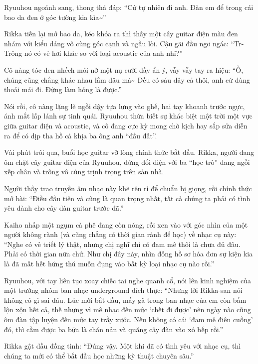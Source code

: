 \documentclass[../main.tex]{subfiles}
\begin{document}
Ryuuhou ngoảnh sang, thong thả đáp: ``Cứ tự nhiên đi anh. Đàn em để trong cái bao da đen ở góc tường kia kìa\~{}''

Rikka tiến lại mở bao da, kéo khóa ra thì thấy một cây guitar điện màu đen nhám với kiểu dáng vô cùng góc cạnh và ngầu lòi. Cậu gãi đầu ngơ ngác: ``Tr-Trông nó có vẻ hơi khác so với loại acoustic của anh nhỉ?''

Cô nàng tóc đen nhếch môi nở một nụ cười đầy ẩn ý, vẫy vẫy tay ra hiệu: ``Ồ, chúng cũng chẳng khác nhau lắm đâu mà\~{} Đều có sáu dây cả thôi, anh cứ dùng thoải mái đi. Đừng làm hỏng là được.''

Nói rồi, cô nàng lặng lẽ ngồi dậy tựa lưng vào ghế, hai tay khoanh trước ngực, ánh mắt lấp lánh sự tinh quái. Ryuuhou thừa biết sự khác biệt một trời một vực giữa guitar điện và acoustic, và cô đang cực kỳ mong chờ kịch hay sắp sửa diễn ra để có dịp tha hồ cà khịa ba ông anh ``đầu đất''.

\ct

Vài phút trôi qua, buổi học guitar vỡ lòng chính thức bắt đầu. Rikka, người đang ôm chặt cây guitar điện của Ryuuhou, đứng đối diện với ba ``học trò'' đang ngồi xếp chân và trông vô cùng trịnh trọng trên sàn nhà.

Người thầy trao truyền âm nhạc này khẽ rên rỉ để chuẩn bị giọng, rồi chính thức mở bài: ``Điều đầu tiên và cũng là quan trọng nhất, tất cả chúng ta phải có tình yêu dành cho cây đàn guitar trước đã.''

Kaiho nhấp một ngụm cà phê đang còn nóng, rồi xen vào với góc nhìn của một người không rành (và cũng chẳng có thời gian rảnh để học) về nhạc cụ này: ``Nghe có vẻ triết lý thật, nhưng chị nghĩ chỉ có đam mê thôi là chưa đủ đâu. Phải có thời gian nữa chứ. Như chị đây này, nhìn đống hồ sơ hóa đơn sự kiện kia là đã mất hết hứng thú muốn đụng vào bất kỳ loại nhạc cụ nào rồi.''

Ryuuhou, với tay liên tục xoay chiếc tai nghe quanh cổ, nói lên kinh nghiệm của một trưởng nhóm ban nhạc underground đích thực: ``Nhưng lời Rikka-san nói không có gì sai đâu. Lúc mới bắt đầu, mấy gã trong ban nhạc của em còn bấm lộn xộn hết cả, thế nhưng vì mê nhạc đến mức `chết đi được' nên ngày nào cũng ôm đàn tập luyện đến mức tay trầy xước. Nếu không có cái `đam mê điên cuồng' đó, thì cầm được ba bữa là chán nản và quăng cây đàn vào xó bếp rồi.''

Rikka gật đầu đồng tình: ``Đúng vậy. Một khi đã có tình yêu với nhạc cụ, thì chúng ta mới có thể bắt đầu học những kỹ thuật chuyên sâu.''
\end{document}

